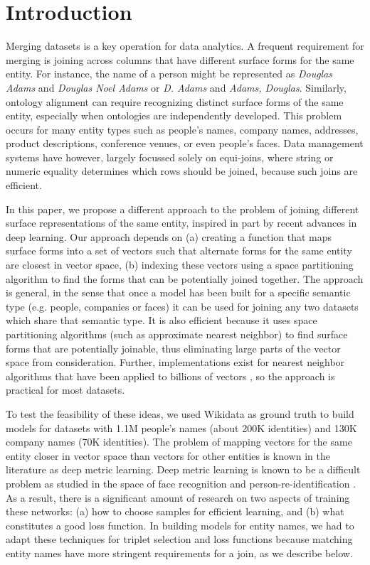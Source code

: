 \section{Introduction}

Merging datasets is a key operation for data analytics.  A frequent
requirement for merging is joining across columns that have
different surface forms for the same entity.  For instance, the name of a person might be represented as \textit{Douglas Adams} and \textit{Douglas Noel Adams} or \textit{D. Adams} and \textit{Adams, Douglas}.  Similarly, ontology alignment can require recognizing distinct surface forms of
the same entity, especially when ontologies are independently
developed.  This problem occurs for many entity types such as people's names, company names, addresses, product descriptions, conference venues, or even people's faces.  Data management systems have however, largely focussed solely on equi-joins, where string or numeric equality determines which rows should be joined, because such joins are efficient.

In this paper, we propose a different approach to the problem of joining different surface representations of the same entity, inspired in part by recent advances in deep learning.  Our approach depends on (a) creating a function that maps surface forms into a set of vectors such that alternate forms for the same entity are closest in vector space, (b) indexing these vectors using a space partitioning algorithm to find the forms that can be potentially joined together.  The approach is general, in the sense that once a model has been built for a specific semantic type (e.g. people, companies or faces) it can be used for joining any two datasets which share that semantic type.  It is also efficient because it uses space partitioning algorithms (such as approximate nearest neighbor) to find surface forms that are potentially joinable, thus eliminating large parts of the vector space from consideration.  Further, implementations exist for nearest neighbor algorithms that have been applied to billions of vectors \cite{JDH17}, so the approach is practical for most datasets.  

To test the feasibility of these ideas, we used Wikidata as ground truth to build models for datasets with 1.1M people's names (about 200K identities) and 130K company names (70K identities).  The problem of mapping vectors for the same entity closer in vector space than vectors for other entities is known in the literature as deep metric learning.  Deep metric learning is known to be a difficult problem as studied in the space of face recognition and person-re-identification \cite{DBLP:conf/cvpr/SchroffKP15}.  As a result, there is a significant amount of research on two aspects of training these networks: (a) how to choose samples for efficient learning, and (b) what constitutes a good loss function.  In building models for entity names, we had to adapt these techniques for triplet selection and loss functions because matching entity names have more stringent requirements for a join, as we describe below.

